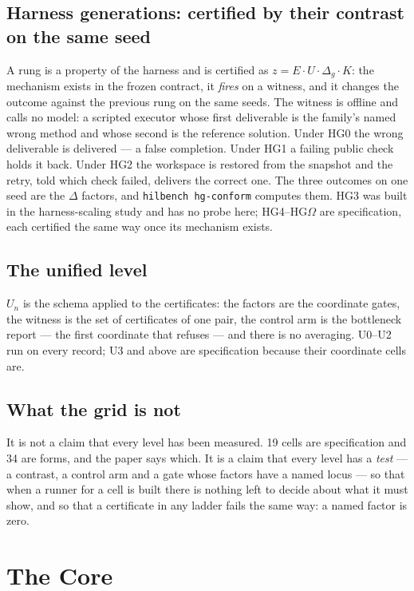 \documentclass[11pt]{article}
\theoremstyle{definition}
\begin{document}
\subsection{Harness generations: certified by their contrast on the same seed}\label{sec:hgcells}
A rung is a property of the harness and is certified as $z = E \cdot U \cdot \Delta_g \cdot K$: the mechanism exists in the frozen contract, it \emph{fires} on a witness, and it changes the outcome against the previous rung on the same seeds. The witness is offline and calls no model: a scripted executor whose first deliverable is the family's named wrong method and whose second is the reference solution. Under HG0 the wrong deliverable is delivered --- a false completion. Under HG1 a failing public check holds it back. Under HG2 the workspace is restored from the snapshot and the retry, told which check failed, delivers the correct one. The three outcomes on one seed are the $\Delta$ factors, and \texttt{hilbench hg-conform} computes them. HG3 was built in the harness-scaling study and has no probe here; HG4--HG$\Omega$ are specification, each certified the same way once its mechanism exists.

\subsection{The unified level}
$U_n$ is the schema applied to the certificates: the factors are the coordinate gates, the witness is the set of certificates of one pair, the control arm is the bottleneck report --- the first coordinate that refuses --- and there is no averaging. U0--U2 run on every record; U3 and above are specification because their coordinate cells are.

\subsection{What the grid is not}
It is not a claim that every level has been measured. 19 cells are specification and 34 are forms, and the paper says which. It is a claim that every level has a \emph{test} --- a contrast, a control arm and a gate whose factors have a named locus --- so that when a runner for a cell is built there is nothing left to decide about what it must show, and so that a certificate in any ladder fails the same way: a named factor is zero.

\section{The Core}\label{sec:core}
\end{document}
